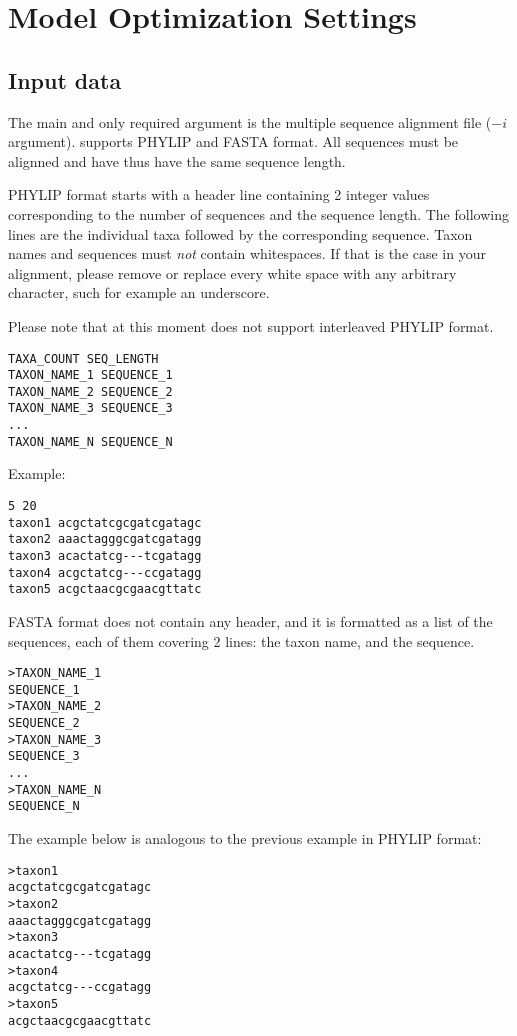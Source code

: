 \section{Model Optimization Settings}
\label{sec:optsettings}

\subsection{Input data}
\label{sec:arg:input}

The main and only required argument is the multiple sequence alignment file ($-i$ argument).
\modeltest supports PHYLIP and FASTA format.
All sequences must be alignned and have thus have the same sequence length.

PHYLIP format starts with a header line containing 2 integer values corresponding to the number of sequences and the sequence length.
The following lines are the individual taxa followed by the corresponding sequence.
Taxon names and sequences must \emph{not} contain whitespaces.
If that is the case in your alignment, please remove or replace every white space with any arbitrary character, such for example an underscore.

Please note that at this moment \modeltest does not support interleaved PHYLIP format.

{
\begin{verbatim}
TAXA_COUNT SEQ_LENGTH
TAXON_NAME_1 SEQUENCE_1
TAXON_NAME_2 SEQUENCE_2
TAXON_NAME_3 SEQUENCE_3
...
TAXON_NAME_N SEQUENCE_N
\end{verbatim}
}

Example:

{
\begin{verbatim}
5 20
taxon1 acgctatcgcgatcgatagc
taxon2 aaactagggcgatcgatagg
taxon3 acactatcg---tcgatagg
taxon4 acgctatcg---ccgatagg
taxon5 acgctaacgcgaacgttatc
\end{verbatim}
}

FASTA format does not contain any header, and it is formatted as a list of the sequences,
each of them covering 2 lines: the taxon name, and the sequence.

{
\begin{verbatim}
>TAXON_NAME_1
SEQUENCE_1
>TAXON_NAME_2
SEQUENCE_2
>TAXON_NAME_3
SEQUENCE_3
...
>TAXON_NAME_N
SEQUENCE_N
\end{verbatim}
}

The example below is analogous to the previous example in PHYLIP format:

{
\begin{verbatim}
>taxon1
acgctatcgcgatcgatagc
>taxon2
aaactagggcgatcgatagg
>taxon3
acactatcg---tcgatagg
>taxon4
acgctatcg---ccgatagg
>taxon5
acgctaacgcgaacgttatc
\end{verbatim}
}

